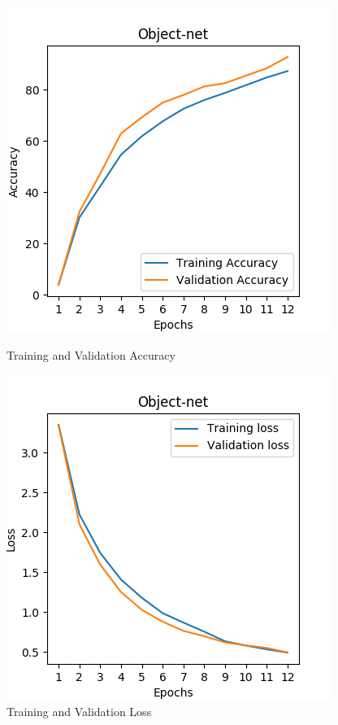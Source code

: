 \begin{figure}[!h]
\centering
\begin{minipage}{0.45\textwidth}
  \centering
        \includegraphics[width=1\linewidth]{images/accuracy.png}
        \caption{Training and Validation Accuracy}
        \label{fig:accuracy}
\end{minipage}%
\begin{minipage}{0.45\textwidth}
  \centering
        \includegraphics[width=1\linewidth]{images/loss.png}
        \caption{Training and Validation Loss}
        \label{fig:loss}
\end{minipage}%
\end{figure}








